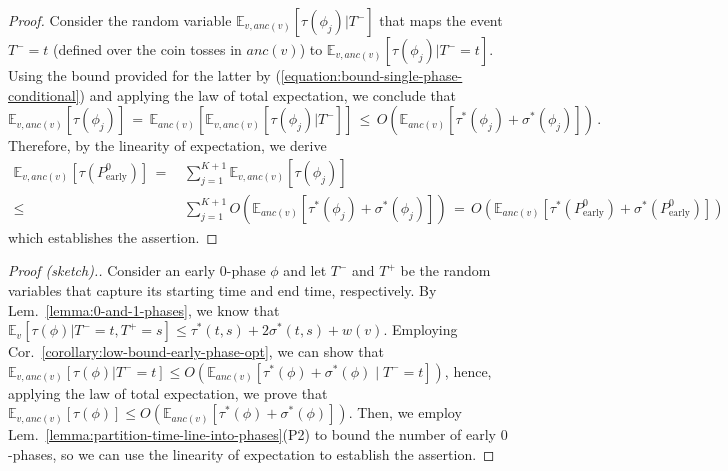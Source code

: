 \documentclass[11pt]{article}
\def\LongVersionEnd{}
\def\ShortVersion{}
\def\ShortVersionEnd{}
\theoremstyle{definition}
\theoremstyle{plain}
\theoremstyle{definition}
\theoremstyle{plain}
\theoremstyle{definition}
\theoremstyle{plain}
\newcommand{\Lem}{Lem.}
\newcommand{\Cor}{Cor.}
\newcommand{\Expect}{\mathbb{E}}
\newcommand{\Ancestors}{\mathit{anc}}
\newcommand{\adv}[1]{{#1}^{*}}
\begin{document}
\begin{proof}
Consider the random variable
$\Expect_{v, \Ancestors(v)}[\tau(\phi_{j}) | T^{-}]$
that maps the event
$T^{-} = t$
(defined over the coin tosses in $\Ancestors(v)$)
to
$\Expect_{v, \Ancestors(v)}[\tau(\phi_{j}) | T^{-} = t]$.
Using the bound provided for the latter by
(\ref{equation:bound-single-phase-conditional}) and applying the law of total
expectation, we conclude that
\[
\Expect_{v, \Ancestors(v)} \left[ \tau(\phi_{j}) \right]
\, = \,
\Expect_{\Ancestors(v)} \left[
\Expect_{v, \Ancestors(v)} \left[ \tau(\phi_{j}) | T^{-} \right]
\right]
\, \leq \,
O \left( \Expect_{\Ancestors(v)} \left[ 
\adv{\tau}(\phi_{j}) + \adv{\sigma}(\phi_{j})
\right] \right) \, .
\]
Therefore, by the linearity of expectation, we derive
\begin{align*}
\Expect_{v, \Ancestors(v)} \left[ \tau(P^{0}_{\mathrm{early}}) \right]
\, = \, &
\sum_{j = 1}^{K + 1} \Expect_{v, \Ancestors(v)} \left[ \tau(\phi_{j}) \right] \\
\leq \, &
\sum_{j = 1}^{K + 1}
O \left( \Expect_{\Ancestors(v)} \left[
\adv{\tau}(\phi_{j}) + \adv{\sigma}(\phi_{j})
\right] \right)
\, = \,
O \left( \Expect_{\Ancestors(v)} \left[
\adv{\tau}(P^{0}_{\mathrm{early}}) + \adv{\sigma}(P^{0}_{\mathrm{early}})
\right] \right)
\end{align*}
which establishes the assertion.
\end{proof}
\LongVersionEnd %
%
\ShortVersion %
\sloppy
\begin{proof}[Proof (sketch).]
Consider an early $0$-phase $\phi$ and let $T^{-}$ and $T^{+}$ be the random
variables that capture its starting time and end time, respectively.
By \Lem{}~\ref{lemma:0-and-1-phases}, we know that
$\Expect_{v}[\tau(\phi) | T^{-} = t, T^{+} = s]
\leq
\adv{\tau}(t, s) + 2 \adv{\sigma}(t, s) + w(v)$.
Employing \Cor{}~\ref{corollary:low-bound-early-phase-opt}, we can
show that
$\Expect_{v, \Ancestors(v)}[\tau(\phi) | T^{-} = t]
\leq
O (\Expect_{\Ancestors(v)}[\adv{\tau}(\phi) + \adv{\sigma}(\phi) \mid T^{-} =
t])$,
hence, applying the law of total expectation, we prove that
$\Expect_{v, \Ancestors(v)}[\tau(\phi)]
\leq
O (\Expect_{\Ancestors(v)}[\adv{\tau}(\phi) + \adv{\sigma}(\phi)])$.
Then, we employ \Lem{}~\ref{lemma:partition-time-line-into-phases}(P2) to
bound the number of early $0$-phases, so we can use the linearity of
expectation to establish the assertion.
\end{proof}
\par\fussy
\ShortVersionEnd %
\end{document}
